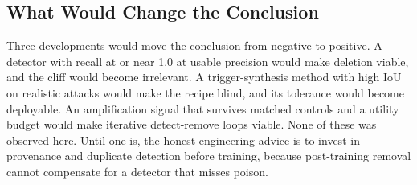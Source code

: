\subsection{What Would Change the Conclusion}
Three developments would move the conclusion from negative to positive. A
detector with recall at or near 1.0 at usable precision would make deletion
viable, and the cliff would become irrelevant. A trigger-synthesis method with
high IoU on realistic attacks would make the recipe blind, and its tolerance
would become deployable. An amplification signal that survives matched controls
and a utility budget would make iterative detect-remove loops viable. None of
these was observed here. Until one is, the honest engineering advice is to invest
in provenance and duplicate detection before training, because post-training
removal cannot compensate for a detector that misses poison.
